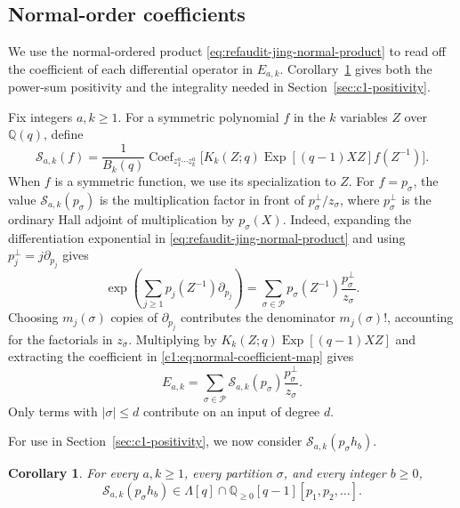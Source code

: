 \documentclass[12pt,reqno,a4paper]{amsart}
\numberwithin{equation}{section}
\numberwithin{figure}{section}
\theoremstyle{plain}
\newtheorem{corollary}[theorem]{Corollary}
\theoremstyle{definition}
\DeclareMathOperator{\Coef}{Coef}
\begin{document}
\subsection{Normal-order coefficients}
\label{c1:subsec:normal-coefficients}

We use the normal-ordered product \eqref{eq:refaudit-jing-normal-product}
to read off the coefficient of each differential operator in $E_{a,k}$.
Corollary~\ref{c1:cor:normal-coefficients} gives both
the power-sum positivity and the integrality needed in
Section~\ref{sec:c1-positivity}.

Fix integers $a,k\geq1$.  For a symmetric polynomial $f$ in the $k$ variables
$Z$ over $\mathbb Q(q)$, define
\begin{equation}\label{c1:eq:normal-coefficient-map}
 \mathcal S_{a,k}(f)
 =\frac1{B_k(q)}\Coef_{z_1^a\cdots z_k^a}
     \bigl[K_k(Z;q)\operatorname{Exp}[(q-1)XZ]f(Z^{-1})\bigr].
\end{equation}
When $f$ is a symmetric function, we use its specialization to $Z$.
For $f=p_\sigma$, the value $\mathcal S_{a,k}(p_\sigma)$ is the
multiplication factor in front of $p_\sigma^\perp/z_\sigma$, where
$p_\sigma^\perp$ is the ordinary Hall adjoint of multiplication by $p_\sigma(X)$.
Indeed, expanding the differentiation exponential in
\eqref{eq:refaudit-jing-normal-product} and using
$p_j^\perp=j\partial_{p_j}$ gives
\[
 \exp\left(\sum_{j\geq1}p_j(Z^{-1})\partial_{p_j}\right)
 =\sum_{\sigma\in\mathscr P}
     p_\sigma(Z^{-1})\frac{p_\sigma^\perp}{z_\sigma}.
\]
Choosing $m_j(\sigma)$ copies of $\partial_{p_j}$ contributes the
denominator $m_j(\sigma)!$, accounting for the factorials in $z_\sigma$.
Multiplying by $K_k(Z;q)\operatorname{Exp}[(q-1)XZ]$ and extracting
the coefficient in \eqref{c1:eq:normal-coefficient-map} gives
\begin{equation}\label{c1:eq:normal-expansion}
 E_{a,k}
 =\sum_{\sigma\in\mathscr P}
    \mathcal S_{a,k}(p_\sigma)\frac{p_\sigma^\perp}{z_\sigma}.
\end{equation}
Only terms with $|\sigma|\leq d$ contribute on an input of degree $d$.

For use in Section~\ref{sec:c1-positivity}, we now consider
$\mathcal S_{a,k}(p_\sigma h_b)$.

\begin{corollary}\label{c1:cor:normal-coefficients}
For every $a,k\geq1$, every partition $\sigma$, and every integer $b\geq0$,
\begin{equation}\label{c1:eq:normal-coeff-positive}
 \mathcal S_{a,k}(p_\sigma h_b)
 \in\Lambda[q]\cap\mathbb Q_{\geq0}[q-1][p_1,p_2,\ldots].
\end{equation}
\end{corollary}
\end{document}
